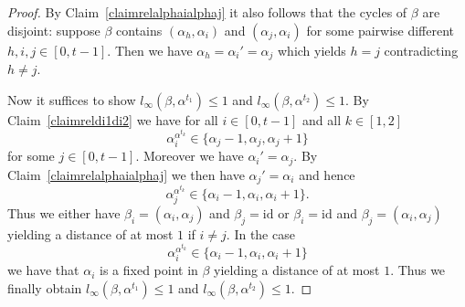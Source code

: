 \documentclass[10pt,a4paper]{amsart}
\begin{document}
\begin{proof}
By Claim~\ref{claimrelalphaialphaj} it also follows that the cycles of $\beta$ are disjoint: suppose $\beta$ contains $(\alpha_h,\alpha_i)$ and $(\alpha_j,\alpha_i)$ for some pairwise different $h,i,j \in [0,t-1]$. Then we have $\alpha_h = \alpha_i' = \alpha_j$ which yields $h = j$ contradicting $h \neq j$.

Now it suffices to show $l_\infty(\beta, \alpha^{t_1}) \leq 1$ and $l_\infty(\beta, \alpha^{t_2}) \leq 1$. By Claim~\ref{claimreldi1di2} we have for all $i \in [0,t-1]$ and all $k \in [1,2]$
\begin{displaymath}
\alpha_i^{\alpha^{t_k}} \in \{\alpha_j-1,\alpha_j,\alpha_j+1\}
\end{displaymath}
for some $j \in [0,t-1]$. Moreover we have $\alpha_i' = \alpha_j$. By Claim~\ref{claimrelalphaialphaj} we then have $\alpha_j' = \alpha_i$ and hence
\begin{displaymath}
\alpha_j^{\alpha^{t_k}} \in \{\alpha_i-1,\alpha_i,\alpha_i+1\}.
\end{displaymath}
Thus we either have $\beta_i = (\alpha_i, \alpha_j)$ and $\beta_j = \mathrm{id}$ or $\beta_i = \mathrm{id}$ and $\beta_j = (\alpha_i, \alpha_j)$ yielding a distance of at most $1$ if $i \neq j$. In the case
\begin{displaymath}
\alpha_i^{\alpha^{t_k}} \in \{\alpha_i-1,\alpha_i,\alpha_i+1\}
\end{displaymath}
we have that $\alpha_i$ is a fixed point in $\beta$ yielding a distance of at most $1$. Thus we finally obtain $l_\infty(\beta, \alpha^{t_1}) \leq 1$ and $l_\infty(\beta, \alpha^{t_2}) \leq 1$.
\end{proof}
\end{document}
